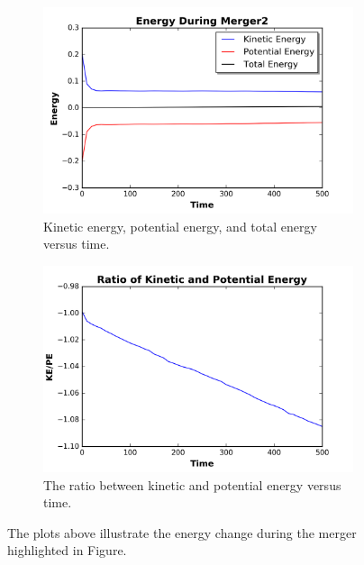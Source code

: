 \documentclass[12pt]{report}
\begin{document}
\begin{figure}[H]
\centering 
    \begin{subfigure}[b]{.475\textwidth}
        \centering
        \includegraphics[width=\linewidth]{totenergy_merger2.png}
        \caption[]%
        {{Kinetic energy, potential energy, and total energy versus time.}}
    
        \label{fig:totalenergy_merger2}
    \end{subfigure} %
    \hfill
    \begin{subfigure}[b]{.475\textwidth}
        \centering
        \includegraphics[width=\linewidth]{ratioenergy_merger2.png}
        \caption[]%
        {{The ratio between kinetic and potential energy versus time.}}
        \label{fig:ratiomerger2}
    \end{subfigure} %
    \caption[]
        {The plots above illustrate the energy change during the merger highlighted in Figure.} 
        \label{fig:energyofmerger2}
\end{figure}
\end{document}
